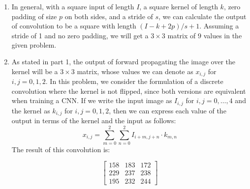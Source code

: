 \documentclass[a4paper]{article}
\begin{document}
\begin{enumerate}
\item{In general, with a square input of length $I$, a square kernel of length $k$, zero padding of size $p$ on both sides, and a stride of $s$, we can calculate the output of convolution to be a square with length $(I-k+2p)/s + 1$. Assuming a stride of 1 and no zero padding, we will get a $3 \times 3$ matrix of $9$ values in the given problem.}
\item{
As stated in part 1, the output of forward propagating the image over the kernel will be a $3 \times 3$ matrix, whose values we can denote as $x_{i,j}$ for $i,j = 0,1,2$. In this problem, we consider the formulation of a discrete convolution where the kernel is not flipped, since both versions are equivalent when training a CNN. If we write the input image as $I_{i,j}$ for $i,j=0,\dots,4$ and the kernel as $k_{i,j}$ for $i,j = 0,1,2$, then we can express each value of the output in terms of the kernel and the input as follows:
$$
x_{i,j} = \sum_{m=0}^2 \sum_{n=0}^2 I_{i+m,j+n} \cdot k_{m,n}
$$
The result of this convolution is:

$$
\begin{bmatrix}
158 & 183 & 172 \\
229 & 237 & 238 \\
195 & 232 & 244 
\end{bmatrix}
$$

}
\end{enumerate}
\end{document}
